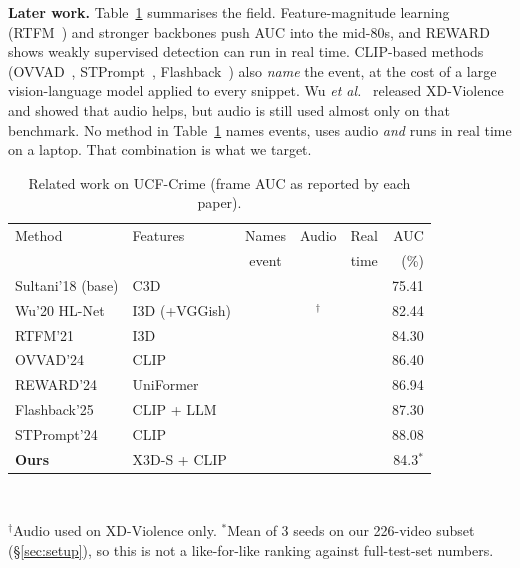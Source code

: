 \documentclass[conference,a4paper]{IEEEtran}
\newcommand{\cmark}{\ding{51}}
\newcommand{\xmark}{\textcolor{black!35}{\ding{55}}}
\begin{document}
\textbf{Later work.} Table~\ref{tab:sota} summarises the field. Feature-magnitude learning (RTFM~\cite{rtfm}) and
stronger backbones push AUC into the mid-80s, and REWARD~\cite{reward} shows weakly supervised detection can run in
real time. CLIP-based methods (OVVAD~\cite{ovvad}, STPrompt~\cite{stprompt}, Flashback~\cite{flashback}) also
\emph{name} the event, at the cost of a large vision-language model applied to every snippet. Wu \emph{et
al.}~\cite{xdv} released XD-Violence and showed that audio helps, but audio is still used almost only on that
benchmark. No method in Table~\ref{tab:sota} names events, uses audio \emph{and} runs in real time on a laptop.
That combination is what we target.

\begin{table}[t]
\centering
\caption{Related work on UCF-Crime (frame AUC as reported by each paper).}
\label{tab:sota}
\setlength{\tabcolsep}{3.2pt}
\footnotesize
\begin{tabular}{@{}llcccr@{}}
\toprule
Method & Features & Names & Audio & Real & AUC \\
 & & event & & time & (\%) \\
\midrule
Sultani'18 \cite{sultani} (base) & C3D & \xmark & \xmark & \xmark & 75.41 \\
Wu'20 HL-Net \cite{xdv} & I3D (+VGGish) & \xmark & \cmark$^\dagger$ & \xmark & 82.44 \\
RTFM'21 \cite{rtfm} & I3D & \xmark & \xmark & \xmark & 84.30 \\
OVVAD'24 \cite{ovvad} & CLIP & \cmark & \xmark & \xmark & 86.40 \\
REWARD'24 \cite{reward} & UniFormer & \xmark & \xmark & \cmark & 86.94 \\
Flashback'25 \cite{flashback} & CLIP + LLM & \cmark & \xmark & \cmark & 87.30 \\
STPrompt'24 \cite{stprompt} & CLIP & \cmark & \xmark & \xmark & 88.08 \\
\midrule
\textbf{Ours} & X3D-S + CLIP & \cmark & \cmark & \cmark & 84.3$^\ast$ \\
\bottomrule
\end{tabular}\\[2pt]
\parbox{\columnwidth}{\scriptsize $^\dagger$Audio used on XD-Violence only. $^\ast$Mean of 3 seeds on our 226-video
subset (\S\ref{sec:setup}), so this is not a like-for-like ranking against full-test-set numbers.}
\end{table}
\end{document}
